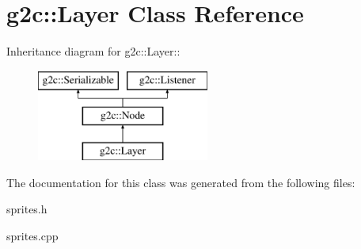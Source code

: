 \hypertarget{classg2c_1_1_layer}{
\section{g2c::Layer Class Reference}
\label{classg2c_1_1_layer}
}
Inheritance diagram for g2c::Layer::\begin{figure}[H]
\begin{center}
\leavevmode
\includegraphics[height=3cm]{classg2c_1_1_layer}
\end{center}
\end{figure}


The documentation for this class was generated from the following files:\begin{DoxyCompactItemize}
\item 
sprites.h\item 
sprites.cpp\end{DoxyCompactItemize}
